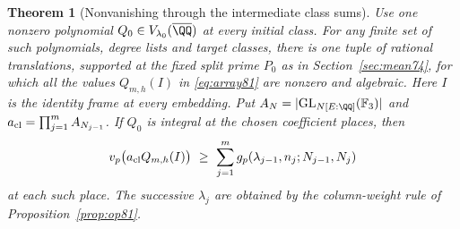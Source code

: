 \documentclass[a4paper,11pt]{article}
\newtheorem{theorem}[proposition]{Theorem}
\theoremstyle{definition}
\theoremstyle{remark}
\numberwithin{equation}{section}
\begin{document}
\begin{theorem}[Nonvanishing through the intermediate class sums]
\label{thm:compose81}
Use one nonzero polynomial \(Q_0\in V_{\lambda_0}(\overline{\QQ})\)
at every initial class. For any finite set of such polynomials,
degree lists and target classes, there is one tuple of rational
translations, supported at the fixed split prime \(P_0\) as in
Section~\ref{sec:mean74}, for which all the values \(Q_{m,h}(I)\)
in \eqref{eq:array81} are nonzero and algebraic. Here \(I\)
is the identity frame at every embedding. Put
\(A_N=|\mathrm{GL}_{N[E:\QQ]}(\mathbb F_3)|\) and
\(a_{\rm cl}=\prod_{j=1}^m A_{N_{j-1}}\).
If \(Q_0\) is integral at the chosen coefficient places, then
\[
  v_p\big(a_{\rm cl} Q_{m,h}(I)\big)\ \ge\
     \sum_{j=1}^m g_p(\lambda_{j-1},n_j;N_{j-1},N_j)
\]
at each such place. The successive \(\lambda_j\) are obtained by
the column-weight rule of Proposition~\ref{prop:op81}.
\end{theorem}
\end{document}
